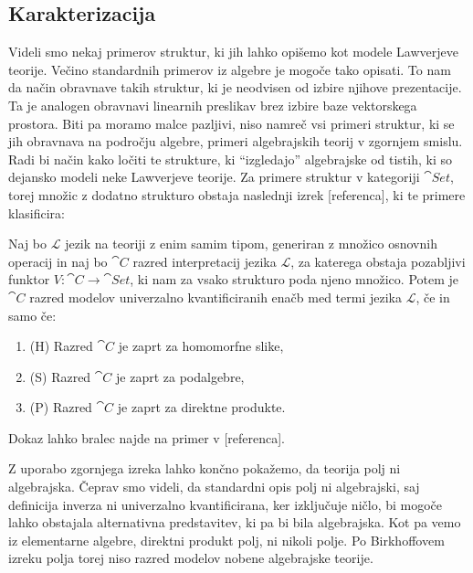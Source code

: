 \documentclass[../kategoricna_logika.tex]{subfiles}
\begin{document}
\subsection{Karakterizacija}
\label{subsec:karakterizacija-lawverjevih-teorij}
%
%
Videli smo nekaj primerov struktur, ki jih lahko opišemo kot modele
Lawverjeve teorije. Večino standardnih primerov iz algebre je mogoče
tako opisati. To nam da način obravnave takih struktur,
ki je neodvisen od izbire njihove prezentacije.
Ta je analogen obravnavi linearnih preslikav brez izbire baze vektorskega
prostora. Biti pa moramo malce pazljivi, niso namreč
vsi primeri struktur, ki se jih obravnava na področju algebre, primeri
algebrajskih teorij v zgornjem smislu. Radi bi način kako ločiti te
strukture, ki "`izgledajo"' algebrajske od tistih, ki so dejansko
modeli neke Lawverjeve teorije. Za primere struktur v kategoriji $\cat{Set}$,
torej množic z dodatno strukturo obstaja naslednji izrek [referenca], ki te
primere klasificira:
\begin{izrek}\label{izrek:Birkhoff-HSP}
  Naj bo $\mathcal{L}$ jezik na teoriji z enim samim tipom, generiran z množico
  osnovnih operacij in naj bo $\cat{C}$ razred interpretacij jezika $\mathcal{L}$,
  za katerega obstaja pozabljivi funktor $V : \cat{C} \to \cat{Set}$, ki nam za
  vsako strukturo poda njeno množico. Potem je $\cat{C}$ razred modelov
  univerzalno kvantificiranih enačb med termi jezika $\mathcal{L}$, če
  in samo če:
  \begin{enumerate}
  \item (H) Razred $\cat{C}$ je zaprt za homomorfne slike,
  \item (S) Razred $\cat{C}$ je zaprt za podalgebre, 
  \item (P) Razred $\cat{C}$ je zaprt za direktne produkte.
  \end{enumerate}
\end{izrek}
Dokaz lahko bralec najde na primer v [referenca].
%
\begin{primer}
  Z uporabo zgornjega izreka lahko končno pokažemo, da teorija polj ni algebrajska.
  Čeprav smo videli, da standardni opis polj ni algebrajski, saj definicija inverza
  ni univerzalno kvantificirana, ker izključuje ničlo, bi mogoče lahko obstajala
  alternativna predstavitev, ki pa bi bila algebrajska. Kot pa vemo iz elementarne
  algebre, direktni produkt polj, ni nikoli polje. Po Birkhoffovem izreku polja
  torej niso razred modelov nobene algebrajske teorije.
\end{primer}
\end{document}
